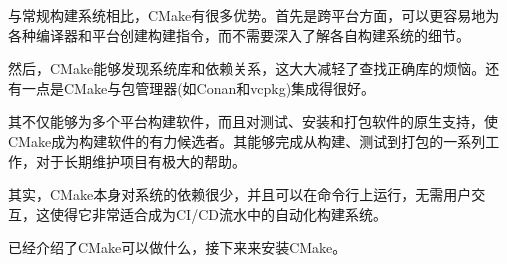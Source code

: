 与常规构建系统相比，CMake有很多优势。首先是跨平台方面，可以更容易地为各种编译器和平台创建构建指令，而不需要深入了解各自构建系统的细节。

然后，CMake能够发现系统库和依赖关系，这大大减轻了查找正确库的烦恼。还有一点是CMake与包管理器(如Conan和vcpkg)集成得很好。

其不仅能够为多个平台构建软件，而且对测试、安装和打包软件的原生支持，使CMake成为构建软件的有力候选者。其能够完成从构建、测试到打包的一系列工作，对于长期维护项目有极大的帮助。

其实，CMake本身对系统的依赖很少，并且可以在命令行上运行，无需用户交互，这使得它非常适合成为CI/CD流水中的自动化构建系统。

已经介绍了CMake可以做什么，接下来来安装CMake。






















